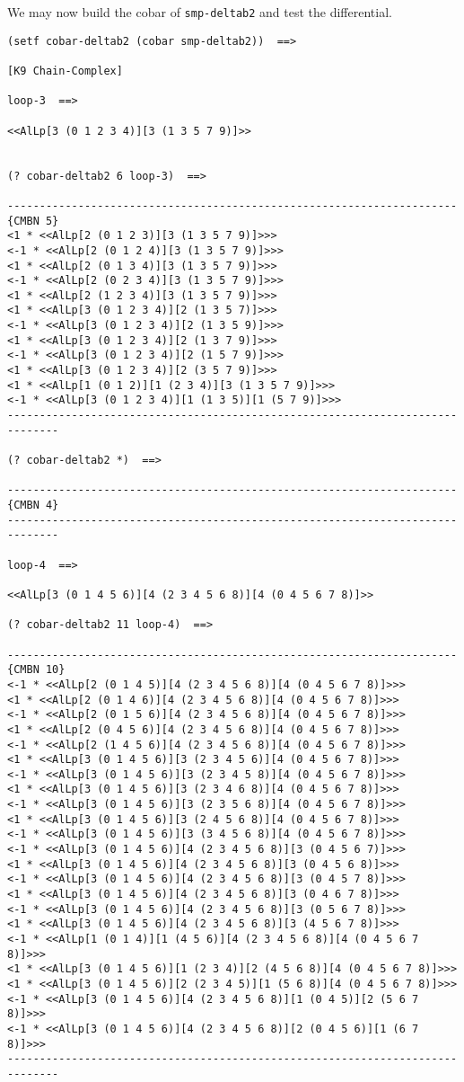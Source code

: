 We may now build the cobar of {\tt smp-deltab2} and test the differential.
{\footnotesize \begin{verbatim}
(setf cobar-deltab2 (cobar smp-deltab2))  ==>

[K9 Chain-Complex]

loop-3  ==>

<<AlLp[3 (0 1 2 3 4)][3 (1 3 5 7 9)]>>


(? cobar-deltab2 6 loop-3)  ==>

----------------------------------------------------------------------{CMBN 5}
<1 * <<AlLp[2 (0 1 2 3)][3 (1 3 5 7 9)]>>>
<-1 * <<AlLp[2 (0 1 2 4)][3 (1 3 5 7 9)]>>>
<1 * <<AlLp[2 (0 1 3 4)][3 (1 3 5 7 9)]>>>
<-1 * <<AlLp[2 (0 2 3 4)][3 (1 3 5 7 9)]>>>
<1 * <<AlLp[2 (1 2 3 4)][3 (1 3 5 7 9)]>>>
<1 * <<AlLp[3 (0 1 2 3 4)][2 (1 3 5 7)]>>>
<-1 * <<AlLp[3 (0 1 2 3 4)][2 (1 3 5 9)]>>>
<1 * <<AlLp[3 (0 1 2 3 4)][2 (1 3 7 9)]>>>
<-1 * <<AlLp[3 (0 1 2 3 4)][2 (1 5 7 9)]>>>
<1 * <<AlLp[3 (0 1 2 3 4)][2 (3 5 7 9)]>>>
<1 * <<AlLp[1 (0 1 2)][1 (2 3 4)][3 (1 3 5 7 9)]>>>
<-1 * <<AlLp[3 (0 1 2 3 4)][1 (1 3 5)][1 (5 7 9)]>>>
------------------------------------------------------------------------------

(? cobar-deltab2 *)  ==>

----------------------------------------------------------------------{CMBN 4}
------------------------------------------------------------------------------

loop-4  ==>

<<AlLp[3 (0 1 4 5 6)][4 (2 3 4 5 6 8)][4 (0 4 5 6 7 8)]>>

(? cobar-deltab2 11 loop-4)  ==>

----------------------------------------------------------------------{CMBN 10}
<-1 * <<AlLp[2 (0 1 4 5)][4 (2 3 4 5 6 8)][4 (0 4 5 6 7 8)]>>>
<1 * <<AlLp[2 (0 1 4 6)][4 (2 3 4 5 6 8)][4 (0 4 5 6 7 8)]>>>
<-1 * <<AlLp[2 (0 1 5 6)][4 (2 3 4 5 6 8)][4 (0 4 5 6 7 8)]>>>
<1 * <<AlLp[2 (0 4 5 6)][4 (2 3 4 5 6 8)][4 (0 4 5 6 7 8)]>>>
<-1 * <<AlLp[2 (1 4 5 6)][4 (2 3 4 5 6 8)][4 (0 4 5 6 7 8)]>>>
<1 * <<AlLp[3 (0 1 4 5 6)][3 (2 3 4 5 6)][4 (0 4 5 6 7 8)]>>>
<-1 * <<AlLp[3 (0 1 4 5 6)][3 (2 3 4 5 8)][4 (0 4 5 6 7 8)]>>>
<1 * <<AlLp[3 (0 1 4 5 6)][3 (2 3 4 6 8)][4 (0 4 5 6 7 8)]>>>
<-1 * <<AlLp[3 (0 1 4 5 6)][3 (2 3 5 6 8)][4 (0 4 5 6 7 8)]>>>
<1 * <<AlLp[3 (0 1 4 5 6)][3 (2 4 5 6 8)][4 (0 4 5 6 7 8)]>>>
<-1 * <<AlLp[3 (0 1 4 5 6)][3 (3 4 5 6 8)][4 (0 4 5 6 7 8)]>>>
<-1 * <<AlLp[3 (0 1 4 5 6)][4 (2 3 4 5 6 8)][3 (0 4 5 6 7)]>>>
<1 * <<AlLp[3 (0 1 4 5 6)][4 (2 3 4 5 6 8)][3 (0 4 5 6 8)]>>>
<-1 * <<AlLp[3 (0 1 4 5 6)][4 (2 3 4 5 6 8)][3 (0 4 5 7 8)]>>>
<1 * <<AlLp[3 (0 1 4 5 6)][4 (2 3 4 5 6 8)][3 (0 4 6 7 8)]>>>
<-1 * <<AlLp[3 (0 1 4 5 6)][4 (2 3 4 5 6 8)][3 (0 5 6 7 8)]>>>
<1 * <<AlLp[3 (0 1 4 5 6)][4 (2 3 4 5 6 8)][3 (4 5 6 7 8)]>>>
<-1 * <<AlLp[1 (0 1 4)][1 (4 5 6)][4 (2 3 4 5 6 8)][4 (0 4 5 6 7 8)]>>>
<1 * <<AlLp[3 (0 1 4 5 6)][1 (2 3 4)][2 (4 5 6 8)][4 (0 4 5 6 7 8)]>>>
<1 * <<AlLp[3 (0 1 4 5 6)][2 (2 3 4 5)][1 (5 6 8)][4 (0 4 5 6 7 8)]>>>
<-1 * <<AlLp[3 (0 1 4 5 6)][4 (2 3 4 5 6 8)][1 (0 4 5)][2 (5 6 7 8)]>>>
<-1 * <<AlLp[3 (0 1 4 5 6)][4 (2 3 4 5 6 8)][2 (0 4 5 6)][1 (6 7 8)]>>>
------------------------------------------------------------------------------


\end{verbatim}}
